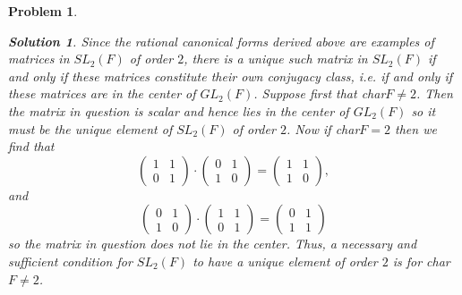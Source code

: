 \documentclass[11pt]{article}
\newcommand{\1}{\textbf{1}}
\newtheorem{prob}{Problem}
\newtheorem*{sol*}{\textit{Solution}}
\begin{document}
\begin{prob}
\begin{sol*}
\noindent\textnormal{Since the rational canonical forms derived above are examples of matrices in $SL_2(F)$ of order $2$, there is a unique such matrix in $SL_2(F)$ if and only if these matrices constitute their own conjugacy class, i.e. if and only if these matrices are in the center of $GL_2(F)$. Suppose first that char$F \neq 2$. Then the matrix in question is scalar and hence lies in the center of $GL_2(F)$ so it must be the unique element of $SL_2(F)$ of order $2$. Now if char$F = 2$ then we find that  \[\begin{pmatrix} 1 & 1 \\ 0 & 1 \end{pmatrix}\cdot\begin{pmatrix} 0 & 1 \\ 1 & 0\end{pmatrix} = \begin{pmatrix} 1 & 1 \\ 1 & 0\end{pmatrix}, \] and \[\begin{pmatrix} 0 & 1 \\ 1 & 0 \end{pmatrix} \cdot \begin{pmatrix} 1 & 1 \\ 0 & 1\end{pmatrix} = \begin{pmatrix} 0 & 1 \\ 1 & 1 \end{pmatrix}\] so the matrix in question does not lie in the center. Thus, a necessary and sufficient condition for $SL_2(F)$ to have a unique element of order $2$ is for char$F\neq 2$. 
}

\end{sol*}
\end{prob}
\end{document}
